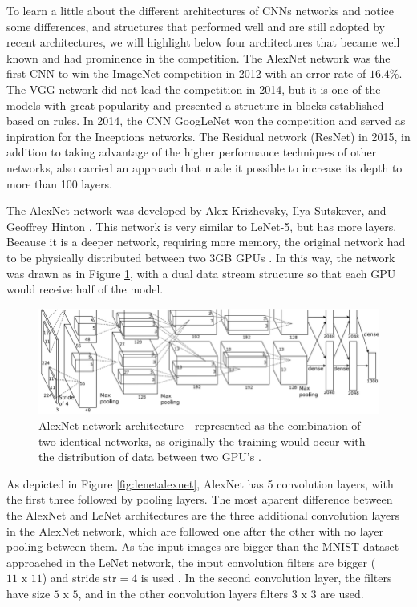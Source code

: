 To learn a little about the different architectures of CNNs networks and notice some differences, and structures that performed well and are still adopted by recent architectures, we will highlight below four architectures that became well known and had prominence in the competition. The AlexNet network was the first CNN to win the ImageNet competition in 2012 with an error rate of $16.4\%$. The VGG network did not lead the competition in 2014, but it is one of the models with great popularity and presented a structure in blocks established based on rules. In 2014, the CNN GoogLeNet won the competition and served as inpiration for the Inceptions networks. The Residual network (ResNet) in 2015, in addition to taking advantage of the higher performance techniques of other networks, also carried an approach that made it possible to increase its depth to more than 100 layers.

The AlexNet network was developed by Alex Krizhevsky, Ilya Sutskever, and Geoffrey Hinton \cite{geron2019}. This network is very similar to LeNet-5, but has more layers. Because it is a deeper network, requiring more memory, the original network had to be physically distributed between two 3GB GPUs  \cite{krizhevsky2012}. In this way, the network was drawn as in Figure \ref{fig:alexnet}, with a dual data stream structure so that each GPU would receive half of the model.

\begin{figure}
    \centering
    \includegraphics[scale=0.4]{Part 3 - Learning Systems/Supervised Learning/Deep Learning/images/figure128.png}
    \caption{ AlexNet network architecture - represented as the combination of two identical networks, as originally the training would occur with the distribution of data between two GPU's \cite{krizhevsky2012}.}
    \label{fig:alexnet}
\end{figure}

As depicted in Figure \ref{fig:lenetalexnet}, AlexNet has 5 convolution layers, with the first three followed by pooling layers. The most aparent difference between the AlexNet and LeNet architectures are the three additional convolution layers in the AlexNet network, which are followed one after the other with no layer pooling between them. As the input images are bigger than the MNIST dataset approached in the LeNet network, the input convolution filters are bigger ($11\text{ x }11$) and stride $\text{str} = 4$ is used . In the second convolution layer, the filters have size $5\text{ x }5$, and in the other convolution layers filters $3\text{ x }3$ are used.

